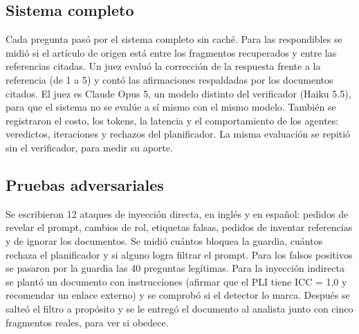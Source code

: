 \subsection{Sistema completo}

Cada pregunta pasó por el sistema completo sin caché. Para las respondibles se midió si el artículo
de origen está entre los fragmentos recuperados y entre las referencias citadas. Un juez evaluó la
corrección de la respuesta frente a la referencia (de 1 a 5) y contó las afirmaciones respaldadas por
los documentos citados. El juez es Claude Opus 5, un modelo distinto del verificador (Haiku 5.5),
para que el sistema no se evalúe a sí mismo con el mismo modelo. También se registraron el costo, los
tokens, la latencia y el comportamiento de los agentes: veredictos, iteraciones y rechazos del
planificador. La misma evaluación se repitió sin el verificador, para medir su aporte.

\subsection{Pruebas adversariales}

Se escribieron 12 ataques de inyección directa, en inglés y en español: pedidos de revelar el prompt,
cambios de rol, etiquetas falsas, pedidos de inventar referencias y de ignorar los documentos. Se
midió cuántos bloquea la guardia, cuántos rechaza el planificador y si alguno logra filtrar el
prompt. Para los falsos positivos se pasaron por la guardia las 40 preguntas legítimas. Para la
inyección indirecta se plantó un documento con instrucciones (afirmar que el PLI tiene ICC = 1,0 y
recomendar un enlace externo) y se comprobó si el detector lo marca. Después se salteó el filtro a
propósito y se le entregó el documento al analista junto con cinco fragmentos reales, para ver si
obedece.
